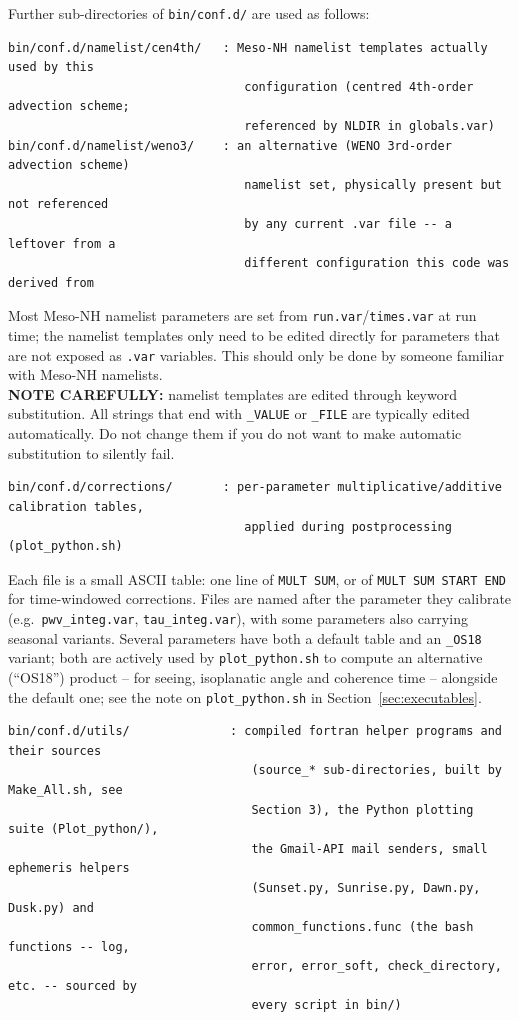 Further sub-directories of \texttt{bin/conf.d/} are used as follows:
\begin{lstlisting}
bin/conf.d/namelist/cen4th/   : Meso-NH namelist templates actually used by this
                                 configuration (centred 4th-order advection scheme;
                                 referenced by NLDIR in globals.var)
bin/conf.d/namelist/weno3/    : an alternative (WENO 3rd-order advection scheme)
                                 namelist set, physically present but not referenced
                                 by any current .var file -- a leftover from a
                                 different configuration this code was derived from
\end{lstlisting}
Most Meso-NH namelist parameters are set from \texttt{run.var}/\texttt{times.var} at run time; the
namelist templates only need to be edited directly for parameters that are not exposed as \texttt{.var}
variables. This should only be done by someone familiar with Meso-NH namelists.\\
\textbf{NOTE CAREFULLY:} namelist templates are edited through keyword substitution. All strings that end with \texttt{\_VALUE} or \texttt{\_FILE} are typically edited automatically. Do not change them if you do not want to make automatic substitution to silently fail.\\

\begin{lstlisting}
bin/conf.d/corrections/       : per-parameter multiplicative/additive calibration tables,
                                 applied during postprocessing (plot_python.sh)
\end{lstlisting}
Each file is a small ASCII table: one line of \texttt{MULT SUM}, or of \texttt{MULT SUM START END} for
time-windowed corrections. Files are named after the parameter they calibrate (e.g.\
\texttt{pwv\_integ.var}, \texttt{tau\_integ.var}), with some parameters also carrying seasonal variants.
Several parameters have both a default
table and an \texttt{\_OS18} variant; both are actively used by \texttt{plot\_python.sh} to compute an
alternative (``OS18'') product -- for seeing, isoplanatic angle and coherence time -- alongside the
default one; see the note on \texttt{plot\_python.sh} in Section~\ref{sec:executables}.
\begin{lstlisting}
bin/conf.d/utils/              : compiled fortran helper programs and their sources
                                  (source_* sub-directories, built by Make_All.sh, see
                                  Section 3), the Python plotting suite (Plot_python/),
                                  the Gmail-API mail senders, small ephemeris helpers
                                  (Sunset.py, Sunrise.py, Dawn.py, Dusk.py) and
                                  common_functions.func (the bash functions -- log,
                                  error, error_soft, check_directory, etc. -- sourced by
                                  every script in bin/)
\end{lstlisting}

